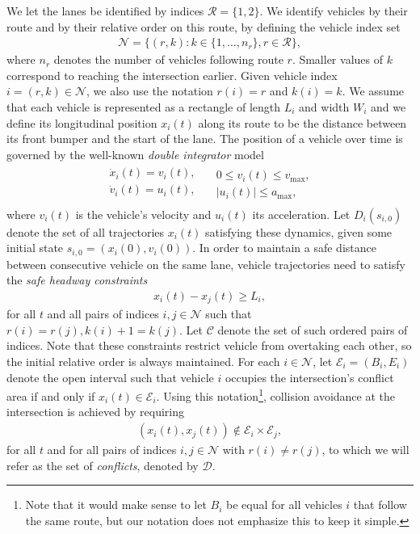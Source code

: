 \documentclass[a4paper]{article}
\theoremstyle{definition}
\theoremstyle{plain}
\begin{document}
We let the lanes be identified by indices $\mathcal{R} = \{ 1, 2 \}$. We
identify vehicles by their route and by their relative order on this route, by
defining the vehicle index set
\begin{align}
  \mathcal{N} = \{ (r, k) : k \in \{1, \dots, n_{r}\}, r \in \mathcal{R}\} ,
\end{align}
where $n_{r}$ denotes the number of vehicles following route $r$. Smaller
values of $k$ correspond to reaching the intersection earlier. Given vehicle
index $i = (r, k) \in \mathcal{N}$, we also use the notation $r(i) = r$ and
$k(i) = k$.
%
We assume that each vehicle is represented as a rectangle of length $L_{i}$ and
width $W_{i}$ and we define its longitudinal position $x_{i}(t)$ along its route
to be the distance between its front bumper and the start of the lane. The
position of a vehicle over time is governed by the well-known \textit{double integrator}
model
\begin{gather}
  \label{eq:vehicle_dynamics}
\begin{aligned}
  \dot{x}_{i}(t) = v_{i}(t) , \\
  \dot{v}_{i}(t) = u_{i}(t)  , \\
\end{aligned}
\quad
\begin{aligned}
  0 \leq v_{i}(t) \leq v_{\max} , \\
  |u_{i}(t) | \leq a_{\max} ,
\end{aligned}
\end{gather}
where $v_{i}(t)$ is the vehicle's velocity and $u_{i}(t)$ its acceleration. Let
$D_{i}(s_{i,0})$ denote the set of all trajectories $x_{i}(t)$ satisfying these
dynamics, given some initial state $s_{i,0} = (x_{i}(0), v_{i}(0))$.
%
In order to maintain a safe distance between consecutive vehicle on the same
lane, vehicle trajectories need to satisfy the \textit{safe headway constraints}
\begin{align}
  \label{eq:follow_constraints}
  x_{i}(t) - x_{j}(t) \geq L_{i} ,
\end{align}
for all $t$ and all pairs of indices $i, j \in \mathcal{N}$ such that
$r(i) = r(j), k(i) + 1 = k(j)$. Let $\mathcal{C}$ denote the set of such ordered
pairs of indices. Note that these constraints restrict vehicle from overtaking
each other, so the initial relative order is always maintained.
%
For each $i \in \mathcal{N}$, let $\mathcal{E}_{i} = (B_{i}, E_{i})$ denote the
open interval such that vehicle $i$ occupies the intersection's conflict area if
and only if $x_{i}(t) \in \mathcal{E}_{i}$. Using this notation\footnote{Note
  that it would make sense to let $B_{i}$ be equal for all vehicles $i$ that
  follow the same route, but our notation does not emphasize this to keep it
  simple.}, collision avoidance at the intersection is achieved by requiring
\begin{align}
  \label{eq:conflict_constraints}
  (x_{i}(t), x_{j}(t)) \notin \mathcal{E}_{i} \times \mathcal{E}_{j} ,
\end{align}
for all $t$ and for all pairs of indices $i, j \in \mathcal{N}$ with
$r(i) \neq r(j)$, to which we will refer as the set of \textit{conflicts}, denoted
by $\mathcal{D}$.
\end{document}

